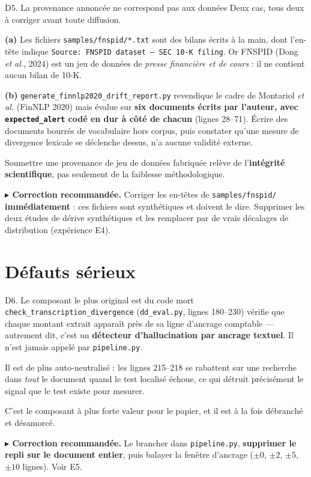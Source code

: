 \documentclass[11pt,a4paper]{article}
\newcommand{\corr}[1]{%
  \par\vspace{4pt}%
  \noindent\textbf{\textcolor{cExp}{$\blacktriangleright$ Correction recommandée.}} #1%
}
\newcommand{\fic}[1]{\texttt{\small #1}}
\begin{document}
\begin{fatal}{D5. La provenance annoncée ne correspond pas aux données}
Deux cas, tous deux à corriger avant toute diffusion.

\textbf{(a)} Les fichiers \fic{samples/fnspid/*.txt} sont des bilans écrits à la
main, dont l'en-tête indique
\fic{Source: FNSPID dataset --- SEC 10-K filing}. Or FNSPID (Dong \textit{et
al.}, 2024) est un jeu de données de \emph{presse financière et de cours} : il ne
contient aucun bilan de 10-K.

\textbf{(b)} \fic{generate\_finnlp2020\_drift\_report.py} revendique le cadre de
Montariol \textit{et al.} (FinNLP 2020) mais évalue sur \textbf{six documents
écrits par l'auteur, avec \fic{expected\_alert} codé en dur à côté de chacun}
(lignes 28--71). Écrire des documents bourrés de vocabulaire hors corpus, puis
constater qu'une mesure de divergence lexicale se déclenche dessus, n'a aucune
validité externe.

Soumettre une provenance de jeu de données fabriquée relève de l'\textbf{intégrité
scientifique}, pas seulement de la faiblesse méthodologique.

\corr{Corriger les en-têtes de \fic{samples/fnspid/} \textbf{immédiatement} : ces
fichiers sont synthétiques et doivent le dire. Supprimer les deux études de
dérive synthétiques et les remplacer par de vrais décalages de distribution
(expérience E4).}
\end{fatal}

\section{Défauts sérieux}
\label{sec:serieux}

\begin{serieux}{D6. Le composant le plus original est du code mort}
\fic{check\_transcription\_divergence} (\fic{dd\_eval.py}, lignes 180--230)
vérifie que chaque montant extrait apparaît près de sa ligne d'ancrage comptable
--- autrement dit, c'est un \textbf{détecteur d'hallucination par ancrage
textuel}. Il n'est jamais appelé par \fic{pipeline.py}.

Il est de plus auto-neutralisé : les lignes 215--218 se rabattent sur une
recherche dans \emph{tout} le document quand le test localisé échoue, ce qui
détruit précisément le signal que le test existe pour mesurer.

C'est le composant à plus forte valeur pour le papier, et il est à la fois
débranché et désamorcé.

\corr{Le brancher dans \fic{pipeline.py}, \textbf{supprimer le repli sur le
document entier}, puis balayer la fenêtre d'ancrage ($\pm 0$, $\pm 2$, $\pm 5$,
$\pm 10$ lignes). Voir E5.}
\end{serieux}
\end{document}
